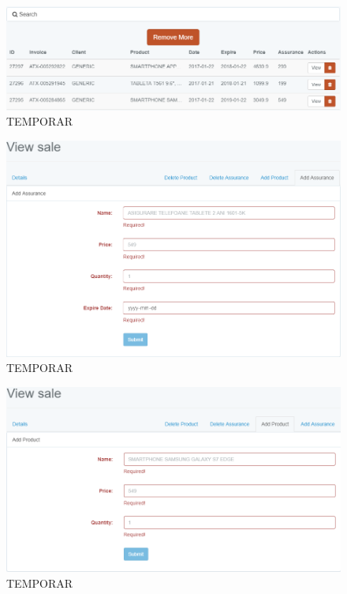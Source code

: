 	\begin{figure}
		\includegraphics[width=\linewidth]{../imagini/sales.png}
		\caption{TEMPORAR}
		\label{fig:TEMP}
	\end{figure}
	\begin{figure}
		\includegraphics[width=\linewidth]{../imagini/sales_add_assurance.png}
		\caption{TEMPORAR}
		\label{fig:TEMP}
	\end{figure}
	\begin{figure}
		\includegraphics[width=\linewidth]{../imagini/sales_add_product.png}
		\caption{TEMPORAR}
		\label{fig:TEMP}
	\end{figure}
